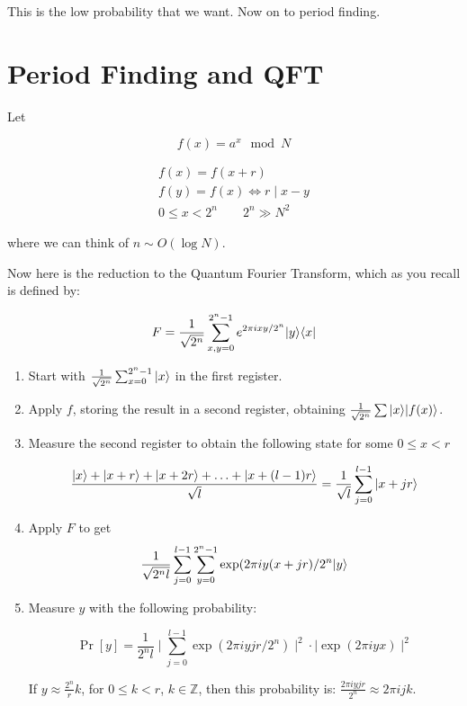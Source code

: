 \documentclass[12pt]{article}
\begin{document}
This is the low probability that we want.
Now on to period finding.

\section{Period Finding and QFT}

Let

\begin{displaymath}
f(x) = a^x \mod N
\end{displaymath}

\begin{multline}
f(x) = f(x+r)\\
f(y) = f(x) \Longleftrightarrow r \mid x-y \\
0 \le x < 2^n \qquad 2^n \gg N^2
\end{multline}

where we can think of $n \sim O(\log N)$.

Now here is the reduction to the Quantum Fourier Transform, which as you recall
is defined by:

\begin{displaymath}
F = \frac{1}{\sqrt{2^n}} \sum_{x,y=0}^{2^n - 1}
e^{2\pi i xy / 2^n} |y \rangle \langle x |
\end{displaymath}

\begin{enumerate}
\item Start with $\frac{1}{\sqrt{2^n}} \sum_{x=0}^{2^n - 1} |x \rangle$ in the
first register.
\item Apply $f$, storing the result in a second register,
obtaining $\frac{1}{\sqrt{2^n}}\sum |x \rangle |f(x) \rangle$.
\item Measure the second register to obtain the following state for some $0 \le x < r$

\begin{displaymath}
\frac{|x \rangle + |x+r \rangle + |x + 2r \rangle + \ldots + |x + (l-1)r \rangle}{\sqrt{l}} =
\frac{1}{\sqrt{l}} \sum_{j=0}^{l-1} |x + jr \rangle
\end{displaymath}

\item Apply $F$ to get
\begin{displaymath}
\frac{1}{\sqrt{2^n l}} \sum_{j=0}^{l-1} \sum_{y=0}^{2^n - 1}
\exp(2\pi i y (x + jr) / 2^n |y \rangle
\end{displaymath}

\item Measure $y$ with the following probability:

\begin{displaymath}
\Pr[y] = \frac{1}{2^nl} \mid \sum_{j=0}^{l-1} \exp(2 \pi i y j r / 2^n) \mid ^2
\cdot \mid \exp(2 \pi i y x) \mid ^2
\end{displaymath}

If $y \approx \frac{2^n}{r}k$, for $0 \le k < r$, $k \in \mathbb{Z}$, then
this probability is: $\frac{2 \pi i y j r}{2^n} \approx 2 \pi i j k$.

\end{enumerate}
\end{document}
